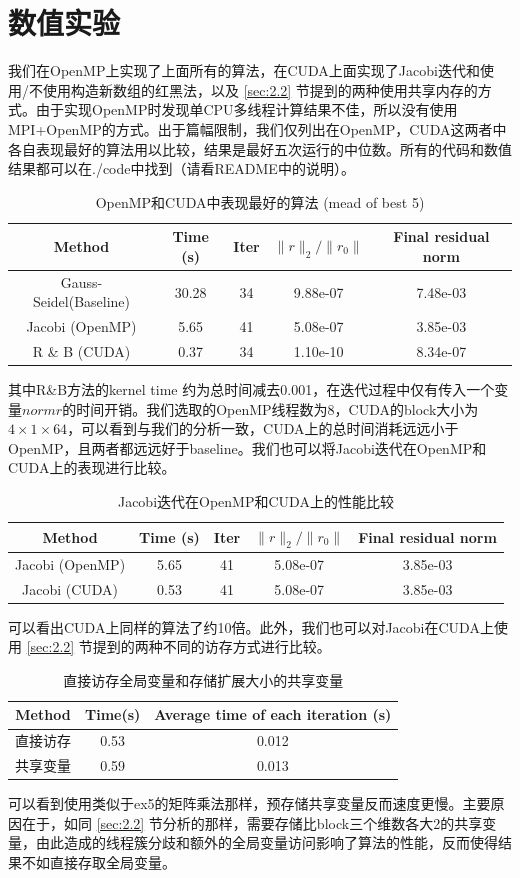 \documentclass{article}
\begin{document}
\section{数值实验}
我们在OpenMP上实现了上面所有的算法，在CUDA上面实现了Jacobi迭代和使用/不使用构造新数组的红黑法，以及 \ref{sec:2.2} 节提到的两种使用共享内存的方式。由于实现OpenMP时发现单CPU多线程计算结果不佳，所以没有使用MPI+OpenMP的方式。出于篇幅限制，我们仅列出在OpenMP，CUDA这两者中各自表现最好的算法用以比较，结果是最好五次运行的中位数。所有的代码和数值结果都可以在./code中找到（请看README中的说明）。
\begin{table}[H]
	\centering
	\begin{tabular}{|c|c|c|c|c|}
	\hline Method & Time (s)& Iter & $\|r\|_2/\|r_0\|$  &  Final residual norm\\ 
	\hline	 Gauss-Seidel(Baseline) & 30.28 &  34 & 9.88e-07 &  7.48e-03 \\
\hline	 Jacobi (OpenMP) & 5.65 &  41 & 5.08e-07 &  3.85e-03 \\
\hline	 R \& B (CUDA) &0.37 & 34 & 1.10e-10 & 8.34e-07 \\\hline
	\end{tabular}
\caption{OpenMP和CUDA中表现最好的算法 (mead of best 5)}
\end{table}
其中R\&B方法的kernel time 约为总时间减去0.001，在迭代过程中仅有传入一个变量$normr$的时间开销。我们选取的OpenMP线程数为8，CUDA的block大小为$4\times1\times 64$，可以看到与我们的分析一致，CUDA上的总时间消耗远远小于OpenMP，且两者都远远好于baseline。我们也可以将Jacobi迭代在OpenMP和CUDA上的表现进行比较。
\begin{table}[H]
	\centering
	\begin{tabular}{|c|c|c|c|c|}
	\hline	Method & Time (s)& Iter & $\|r\|_2/\|r_0\|$  &  Final residual norm \\ 
	\hline	Jacobi (OpenMP) & 5.65 &  41 & 5.08e-07 &  3.85e-03 \\
	\hline	Jacobi (CUDA) &0.53 & 41 & 5.08e-07  &3.85e-03  \\\hline
	\end{tabular}
	\caption{Jacobi迭代在OpenMP和CUDA上的性能比较}
\end{table}
可以看出CUDA上同样的算法了约10倍。此外，我们也可以对Jacobi在CUDA上使用 \ref{sec:2.2} 节提到的两种不同的访存方式进行比较。
\begin{table}[H]
	\centering
	\begin{tabular}{|c|c|c|}
		\hline	Method & Time(s) & Average time of each iteration (s)\\ 
		\hline	直接访存  &0.53 & 0.012 \\
		\hline	共享变量 &0.59 &  0.013\\\hline
	\end{tabular}
	\caption{直接访存全局变量和存储扩展大小的共享变量}
\end{table}
可以看到使用类似于ex5的矩阵乘法那样，预存储共享变量反而速度更慢。主要原因在于，如同 \ref{sec:2.2} 节分析的那样，需要存储比block三个维数各大2的共享变量，由此造成的线程簇分歧和额外的全局变量访问影响了算法的性能，反而使得结果不如直接存取全局变量。
\end{document}
